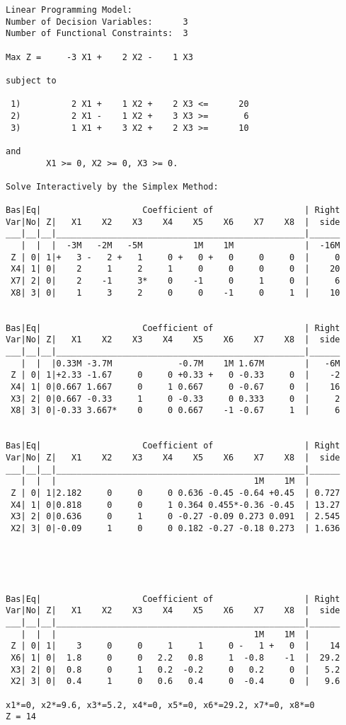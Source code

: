 \documentclass[titlepage, letterpaper]{article}
\begin{document}
\begin{lstlisting}[basicstyle=\tiny]
Linear Programming Model:
Number of Decision Variables:      3
Number of Functional Constraints:  3

Max Z =     -3 X1 +    2 X2 -    1 X3 

subject to

 1)          2 X1 +    1 X2 +    2 X3 <=      20
 2)          2 X1 -    1 X2 +    3 X3 >=       6
 3)          1 X1 +    3 X2 +    2 X3 >=      10

and
        X1 >= 0, X2 >= 0, X3 >= 0.

Solve Interactively by the Simplex Method:

Bas|Eq|                    Coefficient of                  | Right
Var|No| Z|   X1    X2    X3    X4    X5    X6    X7    X8  |  side
___|__|__|_________________________________________________|______
   |  |  |  -3M   -2M   -5M          1M    1M              |  -16M
 Z | 0| 1|+   3 -   2 +   1     0 +   0 +   0     0     0  |     0
 X4| 1| 0|    2     1     2     1     0     0     0     0  |    20
 X7| 2| 0|    2    -1     3*    0    -1     0     1     0  |     6
 X8| 3| 0|    1     3     2     0     0    -1     0     1  |    10


Bas|Eq|                    Coefficient of                  | Right
Var|No| Z|   X1    X2    X3    X4    X5    X6    X7    X8  |  side
___|__|__|_________________________________________________|______
   |  |  |0.33M -3.7M             -0.7M    1M 1.67M        |   -6M
 Z | 0| 1|+2.33 -1.67     0     0 +0.33 +   0 -0.33     0  |    -2
 X4| 1| 0|0.667 1.667     0     1 0.667     0 -0.67     0  |    16
 X3| 2| 0|0.667 -0.33     1     0 -0.33     0 0.333     0  |     2
 X8| 3| 0|-0.33 3.667*    0     0 0.667    -1 -0.67     1  |     6


Bas|Eq|                    Coefficient of                  | Right
Var|No| Z|   X1    X2    X3    X4    X5    X6    X7    X8  |  side
___|__|__|_________________________________________________|______
   |  |  |                                       1M    1M  | 
 Z | 0| 1|2.182     0     0     0 0.636 -0.45 -0.64 +0.45  | 0.727
 X4| 1| 0|0.818     0     0     1 0.364 0.455*-0.36 -0.45  | 13.27
 X3| 2| 0|0.636     0     1     0 -0.27 -0.09 0.273 0.091  | 2.545
 X2| 3| 0|-0.09     1     0     0 0.182 -0.27 -0.18 0.273  | 1.636





Bas|Eq|                    Coefficient of                  | Right
Var|No| Z|   X1    X2    X3    X4    X5    X6    X7    X8  |  side
___|__|__|_________________________________________________|______
   |  |  |                                       1M    1M  | 
 Z | 0| 1|    3     0     0     1     1     0 -   1 +   0  |    14
 X6| 1| 0|  1.8     0     0   2.2   0.8     1  -0.8    -1  |  29.2
 X3| 2| 0|  0.8     0     1   0.2  -0.2     0   0.2     0  |   5.2
 X2| 3| 0|  0.4     1     0   0.6   0.4     0  -0.4     0  |   9.6

x1*=0, x2*=9.6, x3*=5.2, x4*=0, x5*=0, x6*=29.2, x7*=0, x8*=0
Z = 14
\end{lstlisting}
\end{document}
